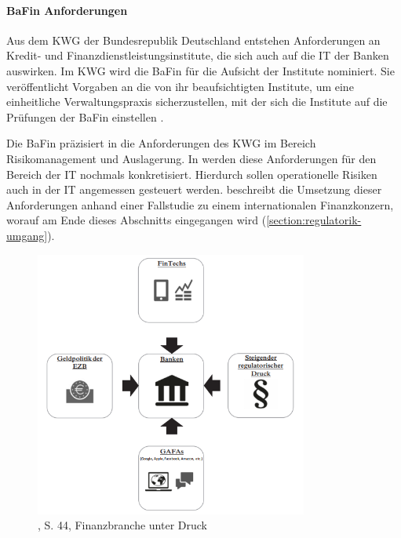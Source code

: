 \paragraph{BaFin Anforderungen}
Aus dem \ac{KWG} der Bundesrepublik Deutschland entstehen Anforderungen an Kredit- und Finanzdienstleistungsinstitute, die sich auch auf die IT der Banken auswirken. Im \ac{KWG} wird die BaFin für die Aufsicht der Institute nominiert. Sie veröffentlicht Vorgaben an die von ihr beaufsichtigten Institute, um eine einheitliche Verwaltungspraxis sicherzustellen, mit der sich die Institute auf die Prüfungen der BaFin einstellen \cite{BaFin:Verwaltungspraxis}. 

Die BaFin präzisiert in \cite{MaRisk:2017} die Anforderungen des \ac{KWG} im Bereich Risikomanagement und Auslagerung. In \cite{BAIT:2018} werden diese Anforderungen für den Bereich der IT nochmals konkretisiert. Hierdurch sollen operationelle Risiken auch in der IT angemessen gesteuert werden. \citet{mci/Knittl2013} beschreibt die Umsetzung dieser Anforderungen anhand einer Fallstudie zu einem internationalen Finanzkonzern, worauf am Ende dieses Abschnitts eingegangen wird (\ref{section:regulatorik-umgang}).

\begin{figure}[htbp]
 \centering
 \includegraphics[width=0.8\textwidth]{gfx/bankdruck.PNG}
 \caption{\citet{Smolinski2017}, S. 44, Finanzbranche unter Druck}\label{fig:bankdruck}
\end{figure}

